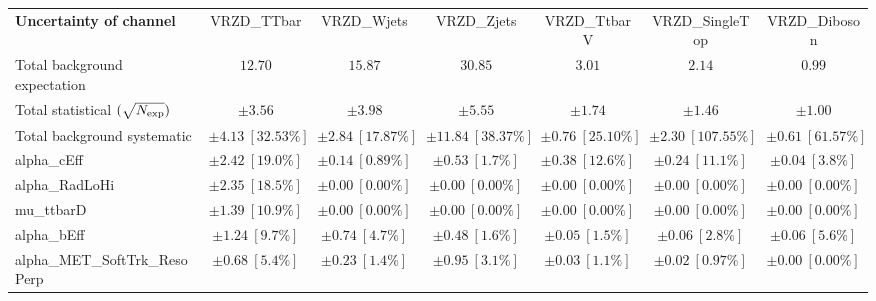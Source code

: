 
\begin{sidewaystable}
\begin{center}
\setlength{\tabcolsep}{0.0pc}
\begin{tabular*}{\textwidth}{@{\extracolsep{\fill}}lcccccc}
\noalign{\smallskip}\hline\noalign{\smallskip}
{\bf Uncertainty of channel}                                    & VRZD\_TTbar            & VRZD\_Wjets            & VRZD\_Zjets            & VRZD\_TtbarV            & VRZD\_SingleTop            & VRZD\_Diboson            \\
\noalign{\smallskip}\hline\noalign{\smallskip}
Total background expectation             &  $12.70$        &  $15.87$        &  $30.85$        &  $3.01$        &  $2.14$        &  $0.99$       \\
\noalign{\smallskip}\hline\noalign{\smallskip}
Total statistical $(\sqrt{N_{\rm exp}})$              & $\pm 3.56$        & $\pm 3.98$        & $\pm 5.55$        & $\pm 1.74$        & $\pm 1.46$        & $\pm 1.00$       \\
Total background systematic               & $\pm 4.13\ [32.53\%] $        & $\pm 2.84\ [17.87\%] $        & $\pm 11.84\ [38.37\%] $        & $\pm 0.76\ [25.10\%] $        & $\pm 2.30\ [107.55\%] $        & $\pm 0.61\ [61.57\%] $             \\
\noalign{\smallskip}\hline\noalign{\smallskip}
\noalign{\smallskip}\hline\noalign{\smallskip}
alpha\_cEff         & $\pm 2.42\ [19.0\%] $          & $\pm 0.14\ [0.89\%] $          & $\pm 0.53\ [1.7\%] $          & $\pm 0.38\ [12.6\%] $          & $\pm 0.24\ [11.1\%] $          & $\pm 0.04\ [3.8\%] $       \\
alpha\_RadLoHi         & $\pm 2.35\ [18.5\%] $          & $\pm 0.00\ [0.00\%] $          & $\pm 0.00\ [0.00\%] $          & $\pm 0.00\ [0.00\%] $          & $\pm 0.00\ [0.00\%] $          & $\pm 0.00\ [0.00\%] $       \\
mu\_ttbarD         & $\pm 1.39\ [10.9\%] $          & $\pm 0.00\ [0.00\%] $          & $\pm 0.00\ [0.00\%] $          & $\pm 0.00\ [0.00\%] $          & $\pm 0.00\ [0.00\%] $          & $\pm 0.00\ [0.00\%] $       \\
alpha\_bEff         & $\pm 1.24\ [9.7\%] $          & $\pm 0.74\ [4.7\%] $          & $\pm 0.48\ [1.6\%] $          & $\pm 0.05\ [1.5\%] $          & $\pm 0.06\ [2.8\%] $          & $\pm 0.06\ [5.6\%] $       \\
alpha\_MET\_SoftTrk\_ResoPerp         & $\pm 0.68\ [5.4\%] $          & $\pm 0.23\ [1.4\%] $          & $\pm 0.95\ [3.1\%] $          & $\pm 0.03\ [1.1\%] $          & $\pm 0.02\ [0.97\%] $          & $\pm 0.00\ [0.00\%] $       \\

\end{tabular*}
\end{center}
\end{sidewaystable}
